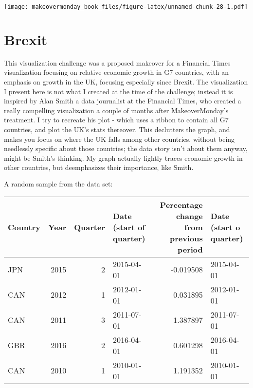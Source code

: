\documentclass[]{book}
\theoremstyle{definition}
\theoremstyle{definition}
\theoremstyle{definition}
\theoremstyle{remark}
\begin{document}
\texttt{[image: makeovermonday\_book\_files/figure-latex/unnamed-chunk-28-1.pdf]}

\chapter{Brexit}\label{brexit}

This visualization challenge was a proposed makeover for a Financial
Times visualization focusing on relative economic growth in G7
countries, with an emphasis on growth in the UK, focusing especially
since Brexit. The visualization I present here is not what I created at
the time of the challenge; instead it is inspired by Alan Smith a data
journalist at the Financial Times, who created a really compelling
visualization a couple of months after MakeoverMonday's treatment. I try
to recreate his plot - which uses a ribbon to contain all G7 countries,
and plot the UK's stats thereover. This declutters the graph, and makes
you focus on where the UK falls among other countries, without being
needlessly specific about those countries; the data story isn't about
them anyway, might be Smith's thinking. My graph actually lightly traces
economic growth in other countries, but deemphasizes their importance,
like Smith.

A random sample from the data set:

\begin{tabular}{l|r|r|l|r|l}
\hline
Country & Year & Quarter & Date (start of quarter) & Percentage change from previous period & Date (start o quarter)\\
\hline
JPN & 2015 & 2 & 2015-04-01 & -0.019508 & 2015-04-01\\
\hline
CAN & 2012 & 1 & 2012-01-01 & 0.031895 & 2012-01-01\\
\hline
CAN & 2011 & 3 & 2011-07-01 & 1.387897 & 2011-07-01\\
\hline
GBR & 2016 & 2 & 2016-04-01 & 0.601298 & 2016-04-01\\
\hline
CAN & 2010 & 1 & 2010-01-01 & 1.191352 & 2010-01-01\\
\hline
\end{tabular}
\end{document}
